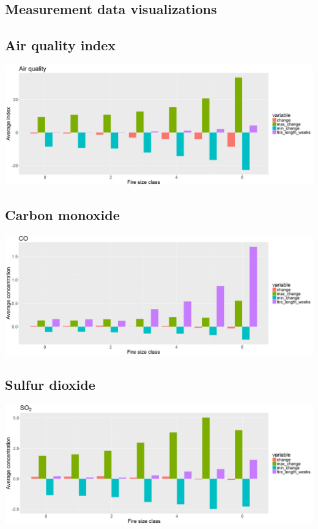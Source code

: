 \documentclass[a4paper,12pt]{article}
\begin{document}
\begin{landscape}
\begin{appendices}
\section{Measurement data visualizations}
\subsection{Air quality index}
\includegraphics[scale=0.5]{aqi_time_series.png}
\subsection{Carbon monoxide}
\includegraphics[scale=0.5]{co_time_series.png}
\subsection{Sulfur dioxide}
\includegraphics[scale=0.5]{so2_time_series.png}

\end{appendices}
\end{landscape}
\end{document}
